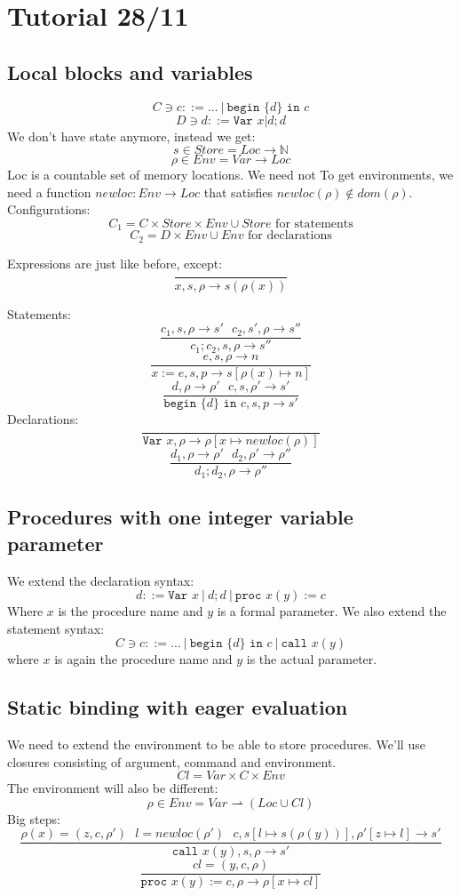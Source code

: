 \documentclass{article}
\begin{document}
\section{Tutorial 28/11}
\subsection{Local blocks and variables}
$$C\ni c::=\dots\ |\ \texttt{begin }\{d\}\texttt{ in } c$$
$$D\ni d::=\texttt{Var }x|d;d$$
We don't have state anymore, instead we get:
$$s\in Store = Loc  \rightarrow \mathbb{N}$$
$$\rho\in Env = Var \rightarrow Loc$$
Loc is a countable set of memory locations. We need not 
To get environments, we need a function $ newloc:Env \rightarrow Loc $ that satisfies $ newloc(\rho)\not\in dom(\rho) $.\\
Configurations:
$$ C_1=C\times Store\times Env \cup Store 
\text{ for statements}$$
$$ C_2= D\times Env\cup Env
\text{ for declarations}$$

Expressions are just like before, except:
$$\frac{}{x,s,\rho \rightarrow s(\rho(x))}$$

Statements:
$$\frac{
	c_1,s,\rho \rightarrow s'\ \ \ 
	c_2,s',\rho \rightarrow s''
}{c_1;c_2,s,\rho \rightarrow s''}$$
$$\frac{
	e,s,\rho \rightarrow n
}{
	x:=e,s,p \rightarrow s[\rho(x)\mapsto n]
}$$
$$\frac{
	d,\rho \rightarrow \rho'\ \ \ 
	c,s,\rho' \rightarrow s'
}{
	\texttt{begin }\{d\}\texttt{ in } c,s,p \rightarrow s'
}$$
Declarations:
$$\frac{
}{
	\texttt{Var }x,\rho \rightarrow \rho[x\mapsto newloc(\rho)]
}$$
$$\frac{
	d_1,\rho  \rightarrow \rho'\ \ \ 
	d_2,\rho'  \rightarrow \rho''
}{
	d_1;d_2,\rho \rightarrow \rho''
}$$
\subsection{Procedures with one integer variable parameter}
We extend the declaration syntax:
$$d::=\texttt{Var }x\ |\ d;d\ |\ \texttt{proc }x(y):=c$$
Where $ x $ is the procedure name and $ y $ is a formal parameter.
We also extend the statement syntax:
$$C\ni c::=\dots\ |\ \texttt{begin }\{d\}\texttt{ in } c\ |\ \texttt{call }x(y)$$
where $ x $ is again the procedure name and $ y $ is the actual parameter.
\subsection{Static binding with eager evaluation}
We need to extend the environment to be able to store procedures.
We'll use closures consisting of argument, command and environment.
$$Cl=Var\times C\times Env$$
The environment will also be different:
$$\rho\in Env = Var \rightharpoonup (Loc\cup Cl)$$
Big steps:
$$\frac{
	\rho(x)=(z,c,\rho')\ \ \ 
	l = newloc(\rho')\ \ \ 
	c,s[l\mapsto s(\rho(y))],\rho'[z\mapsto l] \rightarrow s'
}{\texttt{call }x(y),s,\rho \rightarrow s'}$$
$$\frac{
	cl=(y,c,\rho)
}{\texttt{proc }x(y):=c,\rho \rightarrow \rho[x\mapsto cl]}$$
\end{document}
